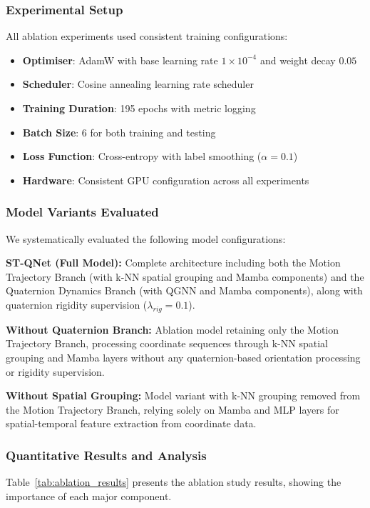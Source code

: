 \documentclass[journal]{IEEEtran}
\theoremstyle{plain}
\begin{document}
\subsubsection{Experimental Setup}
All ablation experiments used consistent training configurations:
\begin{itemize}
    \item \textbf{Optimiser}: AdamW with base learning rate $1 \times 10^{-4}$ and weight decay $0.05$
    \item \textbf{Scheduler}: Cosine annealing learning rate scheduler
    \item \textbf{Training Duration}: 195 epochs with metric logging
    \item \textbf{Batch Size}: 6 for both training and testing
    \item \textbf{Loss Function}: Cross-entropy with label smoothing ($\alpha = 0.1$)
    \item \textbf{Hardware}: Consistent GPU configuration across all experiments
\end{itemize}

\subsubsection{Model Variants Evaluated}
We systematically evaluated the following model configurations:

\textbf{ST-QNet (Full Model):} Complete architecture including both the Motion Trajectory Branch (with k-NN spatial grouping and Mamba components) and the Quaternion Dynamics Branch (with QGNN and Mamba components), along with quaternion rigidity supervision ($\lambda_{rig} = 0.1$).

\textbf{Without Quaternion Branch:} Ablation model retaining only the Motion Trajectory Branch, processing coordinate sequences through k-NN spatial grouping and Mamba layers without any quaternion-based orientation processing or rigidity supervision.

\textbf{Without Spatial Grouping:} Model variant with k-NN grouping removed from the Motion Trajectory Branch, relying solely on Mamba and MLP layers for spatial-temporal feature extraction from coordinate data.

\subsubsection{Quantitative Results and Analysis}
Table~\ref{tab:ablation_results} presents the ablation study results, showing the importance of each major component.
\end{document}
